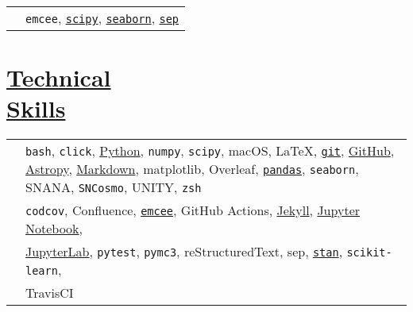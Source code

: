 \documentclass[margin]{res}
\begin{document}
\begin{resume}
\begin{tabular}{l p{4.3in}}
\hspace{-0.6em}{\bf Documentation:} & 
\texttt{emcee},
\href{https://github.com/scipy/scipy/pull/8011}{\texttt{scipy}},
\href{https://github.com/mwaskom/seaborn/pulls?q=is\%3Apr+author\%3Abenjaminrose}{\texttt{seaborn}},
\href{https://github.com/kbarbary/sep/commit/612033788bcce44f110a87e1b54bb70eea9960c2}{\texttt{sep}}\\

\end{tabular}







\section{\href{https://github.com/benjaminrose}{Technical \\Skills}}

\hspace{1pt}
\begin{tabular}{l p{4.5in}}

\hspace{-1em}{\bf Daily Use:} & 
\texttt{bash},
\texttt{click},
\href{https://www.python.org}{Python},
\texttt{numpy},
\texttt{scipy},
macOS,
\LaTeX,
\href{https://git-scm.com}{\texttt{git}},
\href{https://github.com/benjaminrose}{GitHub},
\href{http://www.astropy.org}{Astropy},
\href{http://daringfireball.net/projects/markdown/}{Markdown},
matplotlib,
Overleaf,
\href{http://pandas.pydata.org}{\texttt{pandas}},
\texttt{seaborn},
SNANA,
\texttt{SNCosmo},
UNITY,
\texttt{zsh}
\\

\hspace{-1em}{\bf Proficient:} & 
\texttt{codcov},
Confluence,
\href{http://dan.iel.fm/emcee/current/}{\texttt{emcee}},
GitHub Actions,
\href{https://jekyllrb.com}{Jekyll},
\href{http://jupyter.org}{Jupyter Notebook},
\\&
\href{https://jupyterlab.readthedocs.io/en/stable/}{JupyterLab},
\texttt{pytest},
\texttt{pymc3},
reStructuredText,
sep,
\href{http://mc-stan.org}{\texttt{stan}},
\texttt{scikit-learn},
\\&
TravisCI\vspace{0.3em}
\\


\end{tabular}
\end{resume}
\end{document}

